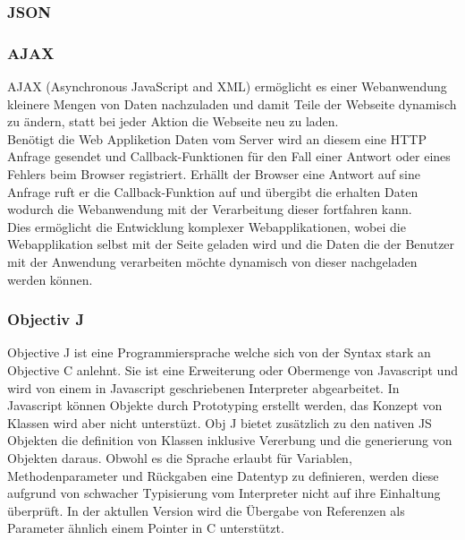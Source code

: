 \subsubsection{JSON}
\label{sec:JSON}

\subsubsection{AJAX}
\label{sec:AJAX}
AJAX (Asynchronous JavaScript and XML) ermöglicht es einer Webanwendung kleinere Mengen von Daten nachzuladen und damit Teile der Webseite dynamisch zu ändern, 
statt bei jeder Aktion die Webseite neu zu laden.
\\
Benötigt die Web Appliketion Daten vom Server wird an diesem eine HTTP Anfrage gesendet und Callback-Funktionen für den Fall einer Antwort oder eines Fehlers beim Browser registriert.
Erhällt der Browser eine Antwort auf sine Anfrage ruft er die Callback-Funktion auf und übergibt die erhalten Daten wodurch die Webanwendung mit der Verarbeitung dieser fortfahren kann.
\\
Dies ermöglicht die Entwicklung komplexer Webapplikationen, wobei die Webapplikation selbst mit der Seite geladen wird und die Daten die der Benutzer mit der Anwendung verarbeiten möchte dynamisch von dieser nachgeladen werden können.

\subsubsection{Objectiv J}
\label{sec:Objectiv J}

Objective J ist eine Programmiersprache welche sich von der Syntax stark an Objective C anlehnt.
Sie ist eine Erweiterung oder Obermenge von Javascript und wird von einem in Javascript geschriebenen Interpreter abgearbeitet.
In Javascript können Objekte durch Prototyping erstellt werden, das Konzept von Klassen wird aber nicht unterstüzt.
Obj J bietet zusätzlich zu den nativen JS Objekten die definition von Klassen inklusive Vererbung und die generierung von Objekten daraus.
Obwohl es die Sprache erlaubt für Variablen, Methodenparameter und Rückgaben eine Datentyp zu definieren, 
werden diese aufgrund von schwacher Typisierung vom Interpreter nicht auf ihre Einhaltung überprüft.
In der aktullen Version wird die Übergabe von Referenzen als Parameter ähnlich einem Pointer in C unterstützt.
\cite{capp}

